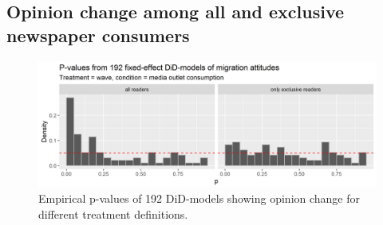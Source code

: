 \documentclass{article}
\begin{document}
\subsection{Opinion change among all and exclusive newspaper consumers}

\begin{figure}
    \centering
    \includegraphics[width=\textwidth]{paper/vis/DiD_model_ps_immint_bytreat.png}
    \caption{Empirical p-values of 192 DiD-models showing opinion change for different treatment definitions.}
    \label{fig:did_by_treat}
\end{figure}
\end{document}
